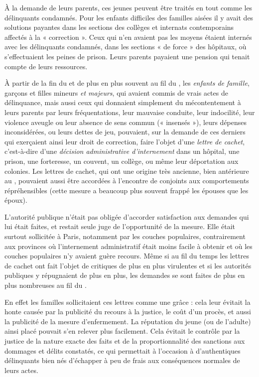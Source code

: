  À la demande de leurs parents, ces jeunes peuvent être traités en tout comme les délinquants con\-dam\-nés. Pour les enfants difficiles des familles aisées il y avait des solutions payantes dans les sections des collèges et internats contemporains affectés à la « correction ». Ceux qui n'en avaient pas les moyens étaient internés avec les délinquants condamnés, dans les sections « de force » des hôpitaux, où s'effectuaient les peines de prison. Leurs parents payaient une pension qui tenait compte de leurs ressources. 

 À partir de la fin du  et de plus en plus souvent au fil du , les \emph{enfants de famille}, garçons et filles mineurs \emph{et majeurs}, qui avaient commis de vrais actes de délinquance, mais aussi ceux qui donnaient simplement du mécontentement à leurs parents par leurs fréquentations, leur mauvaise conduite, leur indocilité, leur violence aveugle ou leur absence de sens commun (« insensés »), leurs dépenses inconsidérées, ou leurs dettes de jeu, pouvaient, sur la demande de ces derniers qui exerçaient ainsi leur droit de correction, faire l'objet d'une \emph{lettre de cachet}, c'est-à-dire d'une \emph{décision administrative d'internement} dans un hôpital, une prison, une forteresse, un couvent, un collège, ou même leur déportation aux colonies. Les lettres de cachet, qui ont une origine très ancienne, bien antérieure au , pouvaient aussi être accordées à l'encontre de conjoints aux comportements répréhensibles (cette mesure a beaucoup plus souvent frappé les épouses que les époux). 

 L'autorité publique n'était pas obligée d'accorder satisfaction aux demandes qui lui était faites, et restait seule juge de l'opportunité de la mesure. Elle était surtout sollicitée à Paris, notamment par les couches populaires, contrairement aux provinces où l'internement administratif était moins facile à obtenir et où les couches populaires n'y avaient guère recours. Même si au fil du temps les lettres de cachet ont fait l'objet de critiques de plus en plus virulentes et si les autorités publiques y répugnaient de plus en plus, les demandes se sont faites de plus en plus nombreuses au fil du . 

 En effet les familles sollicitaient ces lettres comme une grâce : cela leur évitait la honte causée par la publicité du recours à la justice, le coût d'un procès, et aussi la publicité de la mesure d'enfermement. La réputation du jeune (ou de l'adulte) ainsi placé pouvait s'en relever plus facilement. Cela évitait le contrôle par la justice de la nature exacte des faits et de la proportionnalité des sanctions aux dommages et délits constatés, ce qui permettait à l'occasion à d'authentiques délinquants bien nés d'échapper à peu de frais aux conséquences normales de leurs actes. 


